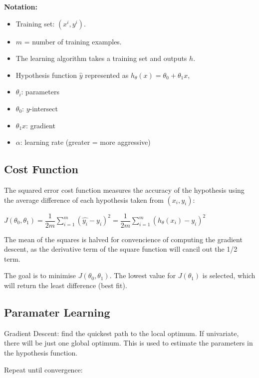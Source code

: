 \documentclass[12pt, a4paper]{article}
\begin{document}
  \textbf{Notation:}
  \vspace{-1em}
  \begin{itemize}
    \item Training set: $(x^i, y^i)$.
    \item $m$ = number of training examples.
    \item The learning algorithm takes a training set and outputs $h$.
    \item Hypothesis function $\hat{y}$ represented as $h_\theta(x) = 
          \theta_0 + \theta_1x$,
    \item $\theta_i$: parameters
    \item $\theta_0$: $y$-intersect
    \item $\theta_1x$: gradient
    \item $\alpha$: learning rate (greater = more aggressive)
  \end{itemize}

  \subsection{Cost Function}

    The squared error cost function measures the accuracy of the 
    hypothesis using the average difference of each hypothesis taken
    from $(x_i, y_i)$:

    $J(\theta_0, \theta_1) = \dfrac {1}{2m} \displaystyle 
    \sum_{i=1}^m \left ( \hat{y_{i}}- y_{i} \right)^2 = \dfrac 
    {1}{2m} \displaystyle \sum_{i=1}^m \left (h_\theta (x_{i}) 
    - y_{i} \right)^2$

    The mean of the squares is halved for convencience of computing the 
    gradient descent, as the derivative term of the square function will
    cancil out the 1/2 term.

    The goal is to minimise $J(\theta_0, \theta_1)$. The lowest 
    value for $J(\theta_1)$ is selected, which will return the 
    least difference (best fit).

  \subsection{Paramater Learning}

    Gradient Descent: find the quickest path to the local optimum. 
    If univariate, there will be just one global optimum. This is used to
    estimate the parameters in the hypothesis function.

    Repeat until convergence:
\end{document}
